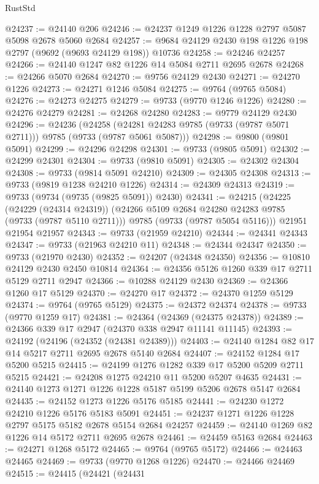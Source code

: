 \begin{lexlean}{RustStd}
\begin{coremodule}
@24237 := @24140 @206
@24246 := @24237 @1249 @1226 @1228 @2797 @5087 @5098 @2678 @5060 @2684
@24257 := @9684 @24129 @2430 @198 @1226 @198 @2797 (@9692 (@9693 @24129 @198)) @10736
@24258 := @24246 @24257
@24266 := @24140 @1247 @82 @1226 @14 @5084 @2711 @2695 @2678
@24268 := @24266 @5070 @2684
@24270 := @9756 @24129 @2430
@24271 := @24270 @1226
@24273 := @24271 @1246 @5084
@24275 := @9764 (@9765 @5084)
@24276 := @24273 @24275
@24279 := @9733 (@9770 @1246 @1226)
@24280 := @24276 @24279
@24281 := @24268 @24280
@24283 := @9779 @24129 @2430
@24296 := @24236
    (@24258 (@24281 @24283 @9785 (@9733 (@9787 @5071 @2711))) @9785 (@9733 (@9787 @5061 @5087)))
@24298 := @9800 (@9801 @5091)
@24299 := @24296 @24298
@24301 := @9733 (@9805 @5091)
@24302 := @24299 @24301
@24304 := @9733 (@9810 @5091)
@24305 := @24302 @24304
@24308 := @9733 (@9814 @5091 @24210)
@24309 := @24305 @24308
@24313 := @9733 (@9819 @1238 @24210 @1226)
@24314 := @24309 @24313
@24319 := @9733 (@9734 (@9735 (@9825 @5091)) @2430)
@24341 := @24215
    (@24225
      (@24229 (@24314 @24319))
      (@24266 @5109 @2684 @24280 @24283 @9785 (@9733 (@9787 @5110 @2711)))
      @9785
      (@9733 (@9787 @5054 @5116)))
    @21951
    @21954
    @21957
@24343 := @9733 (@21959 @24210)
@24344 := @24341 @24343
@24347 := @9733 (@21963 @24210 @11)
@24348 := @24344 @24347
@24350 := @9733 (@21970 @2430)
@24352 := @24207 (@24348 @24350)
@24356 := @10810 @24129 @2430 @2450 @10814
@24364 := @24356 @5126 @1260 @339 @17 @2711 @5129 @2711 @2947
@24366 := @10288 @24129 @2430
@24369 := @24366 @1260 @17 @5129
@24370 := @24270 @17
@24372 := @24370 @1259 @5129
@24374 := @9764 (@9765 @5129)
@24375 := @24372 @24374
@24378 := @9733 (@9770 @1259 @17)
@24381 := @24364 (@24369 (@24375 @24378))
@24389 := @24366 @339 @17 @2947 (@24370 @338 @2947 @11141 @11145)
@24393 := @24192 (@24196 (@24352 (@24381 @24389)))
@24403 := @24140 @1284 @82 @17 @14 @5217 @2711 @2695 @2678 @5140 @2684
@24407 := @24152 @1284 @17 @5200 @5215
@24415 := @24199 @1276 @1282 @339 @17 @5200 @5209 @2711 @5215
@24421 := @24208 @1275 @24210 @11 @5200 @5207 @4635
@24431 := @24140 @1273 @1271 @1226 @1228 @5187 @5199 @5206 @2678 @5147 @2684
@24435 := @24152 @1273 @1226 @5176 @5185
@24441 := @24230 @1272 @24210 @1226 @5176 @5183 @5091
@24451 := @24237 @1271 @1226 @1228 @2797 @5175 @5182 @2678 @5154 @2684 @24257
@24459 := @24140 @1269 @82 @1226 @14 @5172 @2711 @2695 @2678
@24461 := @24459 @5163 @2684
@24463 := @24271 @1268 @5172
@24465 := @9764 (@9765 @5172)
@24466 := @24463 @24465
@24469 := @9733 (@9770 @1268 @1226)
@24470 := @24466 @24469
@24515 := @24415
    (@24421
      (@24431

\end{coremodule}
\end{lexlean}
